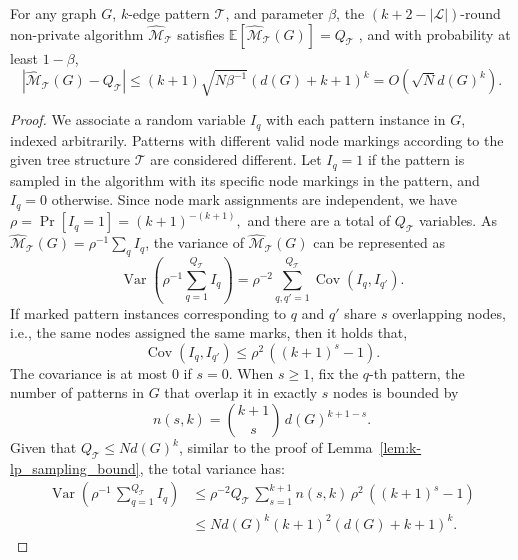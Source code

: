 \begin{lemma}
    For any graph $G$, $k$-edge pattern $\mathcal{T}$, and parameter $\beta$, 
the $(k + 2 - |\mathcal{L}|)$-round non-private algorithm $\widehat{\mathcal{M}}_{\mathcal{T}}$ satisfies
$
    \mathbb{E}[\widehat{\mathcal{M}}_\mathcal{T}(G)] = Q_\mathcal{T}
$
, and with probability at least $1 - \beta$,
\begin{equation*}
    |  \widehat{\mathcal{M}}_\mathcal{T}(G)- Q_\mathcal{T}| \leq
    (k+1) \sqrt{N\beta^{-1}}(d(G)+k+1)^k
    = O(\sqrt{N} d(G)^k).
\end{equation*}

\end{lemma}




\begin{proof}


We associate a random variable $I_q$ with each pattern instance in $G$, indexed arbitrarily. 
Patterns with different valid node markings according to the given tree structure $\mathcal{T}$ are considered different.
Let $I_q = 1$ if the pattern is sampled in the algorithm with its specific node markings in the pattern, and $I_q = 0$ otherwise.
Since node mark assignments are independent, we have
$
    \rho = \Pr[I_q=1] = {(k+1)^{-(k+1)}},
$
and there are a total of $Q_\mathcal{T}$ variables.
As $\widehat{\mathcal{M}}_\mathcal{T}(G) = \rho^{-1}\sum_q I_q$, the variance of $\widehat{\mathcal{M}}_\mathcal{T}(G)$ can be represented as
\begin{equation*}
\operatorname{Var}(\rho^{-1}
\sum_{q=1}^{Q_\mathcal{T}} I_q)
   =\rho^{-2} 
   \sum_{q,{q'} =1}^{Q_\mathcal{T}} 
   \operatorname{Cov}(I_q, I_{q'}).
\end{equation*}
If marked pattern instances corresponding to $q$ and $q'$ share $s$ overlapping nodes, i.e., the same nodes assigned the same marks, then it holds that,
\begin{equation*}
    \operatorname{Cov}(I_q, I_{q'}) 
    \leq \rho^2 \, ((k + 1)^{s}-1).
\end{equation*}
The covariance is at most $0$ if $s = 0$.
When $s \geq 1$, fix the $q$-th pattern, the number of patterns in $G$ that overlap it in exactly $s$ nodes is bounded by 
\begin{equation*}
     n(s, k) =\binom{k+1}{s}\,d(G)^{k+1-s}.
\end{equation*}
Given that $Q_\mathcal{T} \leq Nd(G)^k$, similar to the proof of Lemma~\ref{lem:k-lp_sampling_bound}, the total variance has:
\begin{align*}
     \operatorname{Var}(\rho^{-1}\,
\sum_{q=1}^{Q_\mathcal{T}} I_q)
&\leq 
 \rho^{-2} Q_\mathcal{T} \,
   \sum_{s=1}^{k+1} n(s, k) \, \rho^2 \, ((k + 1)^{s}-1)
   \\
     &\leq  Nd(G)^k (k + 1)^{2} (d(G) + k + 1)^{k}. 
\end{align*}




\end{proof}
